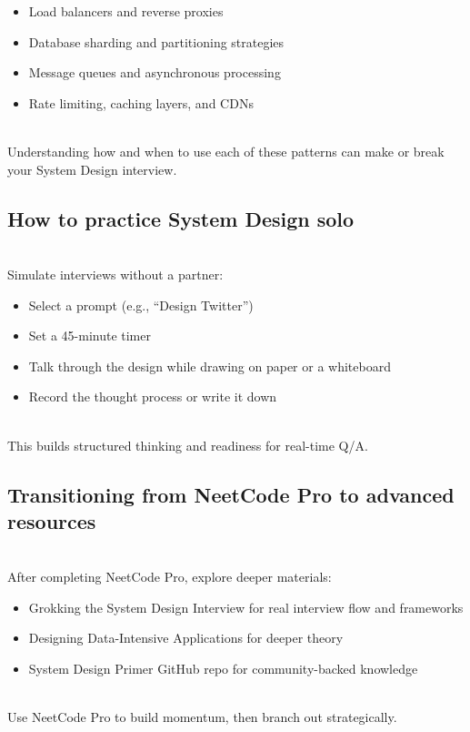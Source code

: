 \begin{itemize}
\item
\protect{}\label{gpslLr58ERNqEXkVrtajh}
Load balancers and reverse proxies
\item
\protect{}\label{MAqvh10kvWxaFgQo_yNEf}
Database sharding and partitioning strategies
\item
\protect{}\label{Il-e2AmA7MdDPjCBTkUW1}
Message queues and asynchronous processing
\item
\protect{}\label{F-XSRXjlkSGfBORCBpsSr}
Rate limiting, caching layers, and CDNs
\end{itemize}
\\
Understanding how and when to use each of these patterns can make or break your System Design interview.

\subsection{How to practice System Design solo}\label{zmmMCYQynynN8ZrdG6-1o}
\\
Simulate interviews without a partner:

\begin{itemize}
\item
\protect{}\label{wHie8CvGpq9JGd_VRHVt3}
Select a prompt (e.g., ``Design Twitter'')
\item
\protect{}\label{zmTeQwMJMyfWZw8qHg4_p}
Set a 45-minute timer
\item
\protect{}\label{LozGJASGYe-yBUDOEirkP}
Talk through the design while drawing on paper or a whiteboard
\item
\protect{}\label{6kh0UhT-PrPWCooUsPxXQ}
Record the thought process or write it down
\end{itemize}
\\
This builds structured thinking and readiness for real-time Q/A.

\subsection{Transitioning from NeetCode Pro to advanced resources}\label{kNC7gxdf2zYAEKrHxNJh5}
\\
After completing NeetCode Pro, explore deeper materials:

\begin{itemize}
\item
\protect{}\label{gjBdlV5uuBAOI0IZa8fo9}
Grokking the System Design Interview for real interview flow and frameworks
\item
\protect{}\label{cASw9dLVm2Bc63XOp7Gmg}
Designing Data-Intensive Applications for deeper theory
\item
\protect{}\label{fdwj3ghfptkb40D0RSw9y}
System Design Primer GitHub repo for community-backed knowledge
\end{itemize}
\\
Use NeetCode Pro to build momentum, then branch out strategically.

